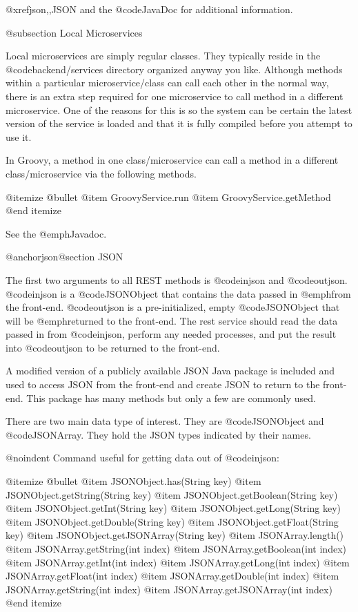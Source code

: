 @xref{json,,JSON} and the @code{JavaDoc} for additional information.


@subsection Local Microservices

Local microservices are simply regular classes.  They typically reside
in the @code{backend/services} directory organized anyway you like.
Although methods within a particular microservice/class can call each
other in the normal way, there is an extra step required for one
microservice to call method in a different microservice.  One of the
reasons for this is so the system can be certain the latest version of
the service is loaded and that it is fully compiled before you attempt
to use it.

In Groovy, a method in one class/microservice can call a method
in a different class/microservice via the following methods.

@itemize @bullet
@item
GroovyService.run
@item
GroovyService.getMethod
@end itemize

See the @emph{Javadoc}.

@anchor{json}@section JSON

The first two arguments to all REST methods is @code{injson} and
@code{outjson}.  @code{injson} is a @code{JSONObject} that contains
the data passed in @emph{from} the front-end.  @code{outjson} is a
pre-initialized, empty @code{JSONObject} that will be @emph{returned
to} the front-end.  The rest service should read the data passed in
from @code{injson}, perform any needed processes, and put the result
into @code{outjson} to be returned to the front-end.

A modified version of a publicly available JSON Java package is
included and used to access JSON from the front-end and create JSON to
return to the front-end.  This package has many methods but only a few are
commonly used.

There are two main data type of interest.  They are @code{JSONObject} and
@code{JSONArray}.  They hold the JSON types indicated by their names.

@noindent
Command useful for getting data out of @code{injson}:

@itemize @bullet
@item
JSONObject.has(String key)
@item
JSONObject.getString(String key)
@item
JSONObject.getBoolean(String key)
@item
JSONObject.getInt(String key)
@item
JSONObject.getLong(String key)
@item
JSONObject.getDouble(String key)
@item
JSONObject.getFloat(String key)
@item
JSONObject.getJSONArray(String key)
@item
JSONArray.length()
@item
JSONArray.getString(int index)
@item
JSONArray.getBoolean(int index)
@item
JSONArray.getInt(int index)
@item
JSONArray.getLong(int index)
@item
JSONArray.getFloat(int index)
@item
JSONArray.getDouble(int index)
@item
JSONArray.getString(int index)
@item
JSONArray.getJSONArray(int index)
@end itemize

